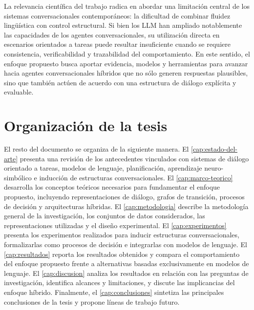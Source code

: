 La relevancia científica del trabajo radica en abordar una limitación central de los
sistemas conversacionales contemporáneos: la dificultad de combinar fluidez lingüística
con control estructural. Si bien los \ac{LLM} han ampliado notablemente las capacidades
de los agentes conversacionales, su utilización directa en escenarios orientados a tareas
puede resultar insuficiente cuando se requiere consistencia, verificabilidad y trazabilidad
del comportamiento. En este sentido, el enfoque propuesto busca aportar evidencia,
modelos y herramientas para avanzar hacia agentes conversacionales híbridos que no
sólo generen respuestas plausibles, sino que también actúen de acuerdo con una estructura
de diálogo explícita y evaluable.

\section{Organización de la tesis}

El resto del documento se organiza de la siguiente manera. El
\cref{cap:estado-del-arte} presenta una revisión de los antecedentes vinculados con
sistemas de diálogo orientado a tareas, modelos de lenguaje, planificación, aprendizaje
neuro-simbólico e inducción de estructuras conversacionales. El
\cref{cap:marco-teorico} desarrolla los conceptos teóricos necesarios para fundamentar
el enfoque propuesto, incluyendo representaciones de diálogo, grafos de transición,
procesos de decisión y arquitecturas híbridas. El \cref{cap:metodologia} describe la
metodología general de la investigación, los conjuntos de datos considerados, las
representaciones utilizadas y el diseño experimental. El \cref{cap:experimentos}
presenta los experimentos realizados para inducir estructuras conversacionales,
formalizarlas como procesos de decisión e integrarlas con modelos de lenguaje. El
\cref{cap:resultados} reporta los resultados obtenidos y compara el comportamiento
del enfoque propuesto frente a alternativas basadas exclusivamente en modelos de
lenguaje. El \cref{cap:discusion} analiza los resultados en relación con las preguntas
de investigación, identifica alcances y limitaciones, y discute las implicancias del enfoque
híbrido. Finalmente, el \cref{cap:conclusiones} sintetiza las principales conclusiones
de la tesis y propone líneas de trabajo futuro.
